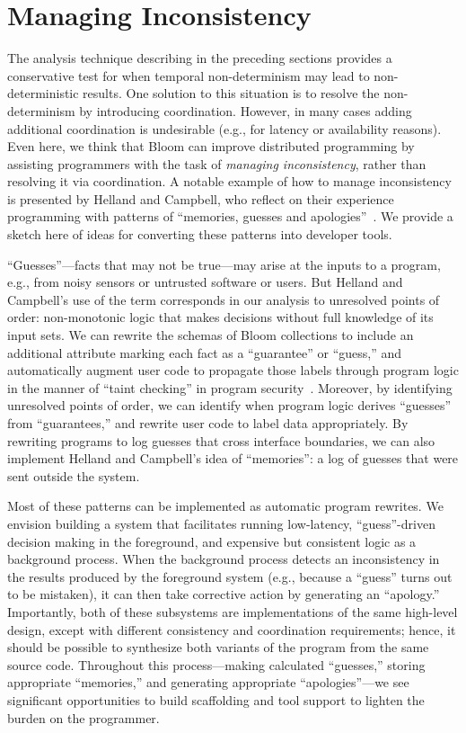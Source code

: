 \section{Managing Inconsistency}
\label{sec:inconsistency}
The analysis technique describing in the preceding sections provides a
conservative test for when temporal non-determinism may lead to
non-deterministic results. One solution to this situation is to resolve the
non-determinism by introducing coordination. However, in many cases adding
additional coordination is undesirable (e.g., for latency or availability
reasons). Even here, we think that Bloom can improve distributed programming by
assisting programmers with the task of \emph{managing inconsistency}, rather
than resolving it via coordination.  A notable example of how to manage
inconsistency is presented by Helland and Campbell, who reflect on their
experience programming with patterns of ``memories, guesses and
apologies''~\cite{quicksand}.  We provide a sketch here of ideas for converting
these patterns into developer tools.

``Guesses''---facts that may not be true---may arise at the inputs to a program,
e.g., from noisy sensors or untrusted software or users.  But Helland and
Campbell's use of the term corresponds in our analysis to unresolved points of
order: non-monotonic logic that makes decisions without full knowledge of its
input sets.  We can rewrite the schemas of Bloom collections to include an
additional attribute marking each fact as a ``guarantee'' or ``guess,'' and
automatically augment user code to propagate those labels through program logic
in the manner of ``taint checking'' in program security~\cite{taint,asbestos}.
Moreover, by identifying unresolved points of order, we can identify when
program logic derives ``guesses'' from ``guarantees,'' and rewrite user code to
label data appropriately. By rewriting programs to log guesses that cross
interface boundaries, we can also implement Helland and Campbell's idea of
``memories'': a log of guesses that were sent outside the system.

Most of these patterns can be implemented as automatic program rewrites. We
envision building a system that facilitates running low-latency,
``guess''-driven decision making in the foreground, and expensive but consistent
logic as a background process. When the background process detects an
inconsistency in the results produced by the foreground system (e.g., because a
``guess'' turns out to be mistaken), it can then take corrective action by
generating an ``apology.'' Importantly, both of these subsystems are
implementations of the same high-level design, except with different consistency
and coordination requirements; hence, it should be possible to synthesize both
variants of the program from the same source code. Throughout this
process---making calculated ``guesses,'' storing appropriate ``memories,'' and
generating appropriate ``apologies''---we see significant opportunities to build
scaffolding and tool support to lighten the burden on the programmer.


